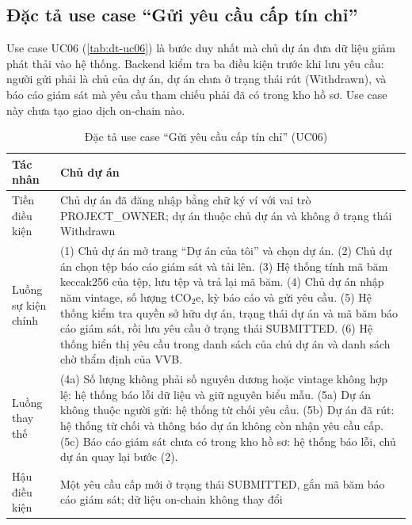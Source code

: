 \subsection*{Đặc tả use case ``Gửi yêu cầu cấp tín chỉ''}
\label{subsec:dt-uc06}

Use case UC06 (\autoref{tab:dt-uc06}) là bước duy nhất mà chủ dự án đưa dữ liệu giảm phát thải vào hệ thống. Backend kiểm tra ba điều kiện trước khi lưu yêu cầu: người gửi phải là chủ của dự án, dự án chưa ở trạng thái rút (Withdrawn), và báo cáo giám sát mà yêu cầu tham chiếu phải đã có trong kho hồ sơ. Use case này chưa tạo giao dịch on-chain nào.

\begin{table}[!htbp]
    \centering
    \caption{Đặc tả use case ``Gửi yêu cầu cấp tín chỉ'' (UC06)}
    \label{tab:dt-uc06}
    \small
    \begin{tabularx}{\textwidth}{|L{2.8cm}|Y|}
        \hline
        Tác nhân & Chủ dự án \\
        \hline
        Tiền điều kiện & Chủ dự án đã đăng nhập bằng chữ ký ví với vai trò PROJECT\_OWNER; dự án thuộc chủ dự án và không ở trạng thái Withdrawn \\
        \hline
        Luồng sự kiện chính & (1) Chủ dự án mở trang ``Dự án của tôi'' và chọn dự án.\newline
        (2) Chủ dự án chọn tệp báo cáo giám sát và tải lên.\newline
        (3) Hệ thống tính mã băm keccak256 của tệp, lưu tệp và trả lại mã băm.\newline
        (4) Chủ dự án nhập năm vintage, số lượng tCO$_2$e, kỳ báo cáo và gửi yêu cầu.\newline
        (5) Hệ thống kiểm tra quyền sở hữu dự án, trạng thái dự án và mã băm báo cáo giám sát, rồi lưu yêu cầu ở trạng thái SUBMITTED.\newline
        (6) Hệ thống hiển thị yêu cầu trong danh sách của chủ dự án và danh sách chờ thẩm định của VVB. \\
        \hline
        Luồng thay thế & (4a) Số lượng không phải số nguyên dương hoặc vintage không hợp lệ: hệ thống báo lỗi dữ liệu và giữ nguyên biểu mẫu.\newline
        (5a) Dự án không thuộc người gửi: hệ thống từ chối yêu cầu.\newline
        (5b) Dự án đã rút: hệ thống từ chối và thông báo dự án không còn nhận yêu cầu cấp.\newline
        (5c) Báo cáo giám sát chưa có trong kho hồ sơ: hệ thống báo lỗi, chủ dự án quay lại bước (2). \\
        \hline
        Hậu điều kiện & Một yêu cầu cấp mới ở trạng thái SUBMITTED, gắn mã băm báo cáo giám sát; dữ liệu on-chain không thay đổi \\
        \hline
    \end{tabularx}
\end{table}

